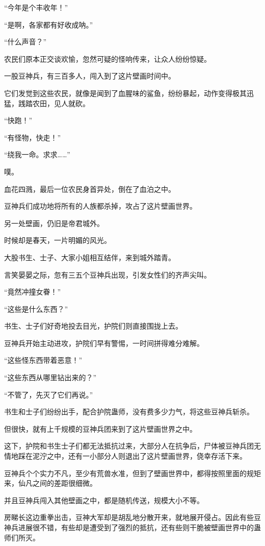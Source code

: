 \begin{this_body}
“今年是个丰收年！”

“是啊，各家都有好收成呐。”

“什么声音？”

农民们原本正交谈欢愉，忽然可疑的怪响传来，让众人纷纷惊疑。

一股豆神兵，有三百多人，闯入到了这片壁画时间中。

它们发觉到这些农民，就像是闻到了血腥味的鲨鱼，纷纷暴起，动作变得极其迅猛，践踏农田，见人就砍。

“快跑！”

“有怪物，快走！”

“绕我一命。求求……”

噗。

血花四溅，最后一位农民身首异处，倒在了血泊之中。

豆神兵们成功地将所有的人族都杀掉，攻占了这片壁画世界。

另一处壁画，仍旧是帝君城外。

时候却是春天，一片明媚的风光。

大股书生、士子、大家小姐相互结伴，来到城外踏青。

言笑晏晏之际，忽有三五个豆神兵出现，引发女性们的齐声尖叫。

“竟然冲撞女眷！”

“这些是什么东西？”

书生、士子们好奇地投去目光，护院们则直接围拢上去。

豆神兵开始主动进攻，护院们早有警惕，一时间拼得难分难解。

“这些怪东西带着恶意！”

“这些东西从哪里钻出来的？”

“不管了，先灭了它们再说。”

书生和士子们纷纷出手，配合护院蛊师，没有费多少力气，将这些豆神兵斩杀。

但很快，就有上千规模的豆神兵团来到了这片壁画世界之中。

这下，护院和书生士子们都无法抵抗过来，大部分人在抗争后，尸体被豆神兵团无情地踩在泥泞之中，还有一小部分人则退出了这片壁画世界，侥幸存活下来。

豆神兵个个实力不凡，至少有荒兽水准，但到了壁画世界中，都得按照里面的规矩来，仙凡之间的差距很细微。

并且豆神兵闯入其他壁画之中，都是随机传送，规模大小不等。

房睇长这边重拳出击，豆神大军却是胡乱地分散开来，就地展开侵占。因此有些豆神兵进展很不错，有些却是遭受到了强烈的抵抗，还有些则干脆被壁画世界中的蛊师们所灭。


\end{this_body}
